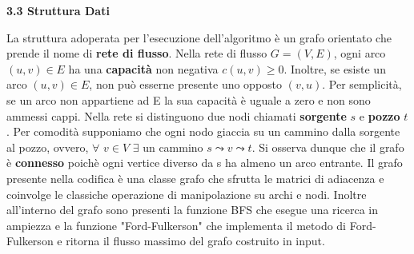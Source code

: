 \documentclass{article}
\begin{document}
\begin{flushleft}
\hfill
\newline
\begin{Large} \textbf{3.3 Struttura Dati}\end{Large}
\newline
\newline
La struttura adoperata per l'esecuzione dell'algoritmo è un grafo orientato che prende il nome di \textbf{rete di flusso}. Nella rete di flusso $G = (V, E)$, ogni arco $(u, v) \in E$ ha una \textbf{capacità} non negativa $c(u, v)\geq 0$. Inoltre, se esiste un arco $(u, v) \in E$, non può esserne presente uno opposto $(v, u)$. Per semplicità, se un arco non appartiene ad E la sua capacità è uguale a zero e non sono ammessi cappi.
\newline
Nella rete si distinguono due nodi chiamati \textbf{sorgente} $s$ e \textbf{pozzo} $t$.
\newline
Per comodità supponiamo che ogni nodo giaccia su un cammino dalla sorgente al pozzo, ovvero, $\forall$  $v \in V$  $\exists$ un cammino $s \leadsto v \leadsto t$. Si osserva dunque che il grafo è \textbf{connesso} poichè ogni vertice diverso da s ha almeno un arco entrante.
\newline
\newline
Il grafo presente nella codifica è una classe grafo che sfrutta le matrici di adiacenza e coinvolge le classiche operazione di manipolazione su archi e nodi. Inoltre all'interno del grafo sono presenti la funzione BFS che esegue una ricerca in ampiezza e la funzione "Ford-Fulkerson" che implementa il metodo di Ford-Fulkerson e ritorna il flusso massimo del grafo costruito in input. 
\newline
\newline


\end{flushleft}
\end{document}
